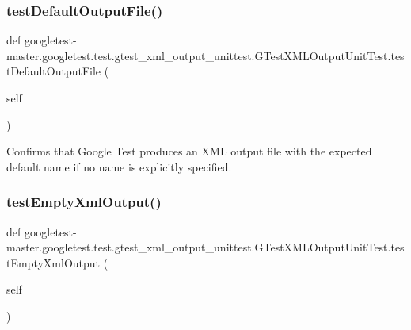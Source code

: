 \subsubsection{\texorpdfstring{testDefaultOutputFile()}{testDefaultOutputFile()}}
{\footnotesize\ttfamily def googletest-\/master.\+googletest.\+test.\+gtest\+\_\+xml\+\_\+output\+\_\+unittest.\+G\+Test\+X\+M\+L\+Output\+Unit\+Test.\+test\+Default\+Output\+File (\begin{DoxyParamCaption}\item[{}]{self }\end{DoxyParamCaption})}

\begin{DoxyVerb}Confirms that Google Test produces an XML output file with the expected
default name if no name is explicitly specified.
\end{DoxyVerb}
 \mbox{\label{classgoogletest-master_1_1googletest_1_1test_1_1gtest__xml__output__unittest_1_1_g_test_x_m_l_output_unit_test_ae542ec73d7968e7671eff37ec6d084c7}} 
\subsubsection{\texorpdfstring{testEmptyXmlOutput()}{testEmptyXmlOutput()}}
{\footnotesize\ttfamily def googletest-\/master.\+googletest.\+test.\+gtest\+\_\+xml\+\_\+output\+\_\+unittest.\+G\+Test\+X\+M\+L\+Output\+Unit\+Test.\+test\+Empty\+Xml\+Output (\begin{DoxyParamCaption}\item[{}]{self }\end{DoxyParamCaption})}

